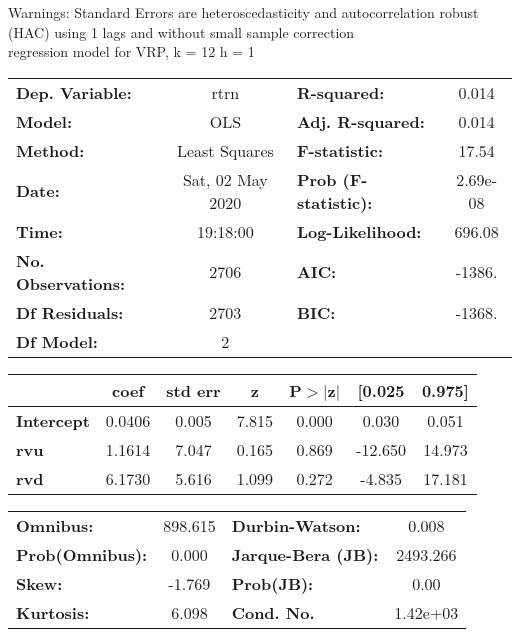 Warnings: \newline
 [1] Standard Errors are heteroscedasticity and autocorrelation robust (HAC) using 1 lags and without small sample correction\\ 

regression model for VRP, k = 12 h = 1\begin{center}
\begin{tabular}{lclc}
\toprule
\textbf{Dep. Variable:}    &       rtrn       & \textbf{  R-squared:         } &     0.014   \\
\textbf{Model:}            &       OLS        & \textbf{  Adj. R-squared:    } &     0.014   \\
\textbf{Method:}           &  Least Squares   & \textbf{  F-statistic:       } &     17.54   \\
\textbf{Date:}             & Sat, 02 May 2020 & \textbf{  Prob (F-statistic):} &  2.69e-08   \\
\textbf{Time:}             &     19:18:00     & \textbf{  Log-Likelihood:    } &    696.08   \\
\textbf{No. Observations:} &        2706      & \textbf{  AIC:               } &    -1386.   \\
\textbf{Df Residuals:}     &        2703      & \textbf{  BIC:               } &    -1368.   \\
\textbf{Df Model:}         &           2      & \textbf{                     } &             \\
\bottomrule
\end{tabular}
\begin{tabular}{lcccccc}
                   & \textbf{coef} & \textbf{std err} & \textbf{z} & \textbf{P$> |$z$|$} & \textbf{[0.025} & \textbf{0.975]}  \\
\midrule
\textbf{Intercept} &       0.0406  &        0.005     &     7.815  &         0.000        &        0.030    &        0.051     \\
\textbf{rvu}       &       1.1614  &        7.047     &     0.165  &         0.869        &      -12.650    &       14.973     \\
\textbf{rvd}       &       6.1730  &        5.616     &     1.099  &         0.272        &       -4.835    &       17.181     \\
\bottomrule
\end{tabular}
\begin{tabular}{lclc}
\textbf{Omnibus:}       & 898.615 & \textbf{  Durbin-Watson:     } &    0.008  \\
\textbf{Prob(Omnibus):} &   0.000 & \textbf{  Jarque-Bera (JB):  } & 2493.266  \\
\textbf{Skew:}          &  -1.769 & \textbf{  Prob(JB):          } &     0.00  \\
\textbf{Kurtosis:}      &   6.098 & \textbf{  Cond. No.          } & 1.42e+03  \\
\bottomrule
\end{tabular}
\end{center}

